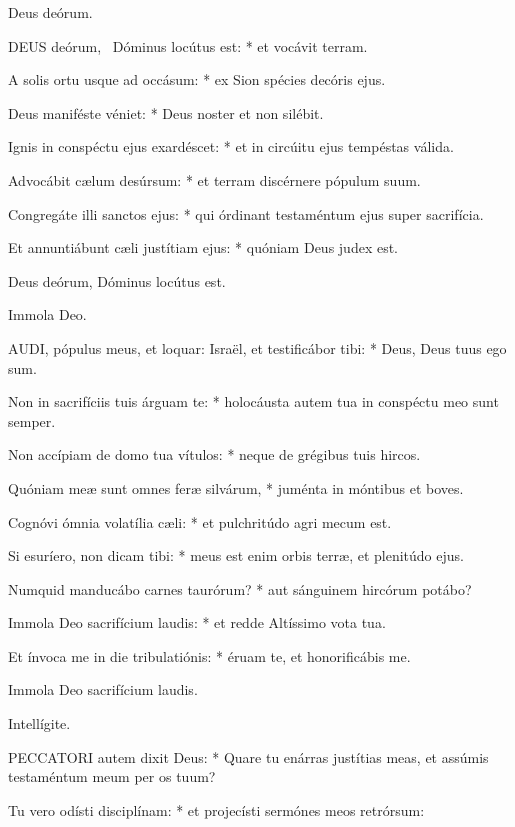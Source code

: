  Deus deórum. \textdagger


\lettrine[lines=2]{D}{EUS} deórum, \textdagger\ Dóminus locútus est: * et vocávit terram.

A solis ortu usque ad occásum: * ex Sion spécies decóris ejus.

Deus maniféste véniet: * Deus noster et non silébit.

Ignis in conspéctu ejus exardéscet: * et in circúitu ejus tempéstas válida.

Advocábit cælum desúrsum: * et terram discérnere pópulum suum.

Congregáte illi sanctos ejus: * qui órdinant testaméntum ejus super sacrifícia.

Et annuntiábunt cæli justítiam ejus: * quóniam Deus judex est.

 Deus deórum, Dóminus locútus est.

 Immola Deo.


\lettrine[lines=2]{A}{UDI}, pópulus meus, et loquar: Israël, et testificábor tibi: * Deus, Deus tuus ego sum.

Non in sacrifíciis tuis árguam te: * holocáusta autem tua in conspéctu meo sunt semper.

Non accípiam de domo tua vítulos: * neque de grégibus tuis hircos.

Quóniam meæ sunt omnes feræ silvárum, * juménta in móntibus et boves.

Cognóvi ómnia volatília cæli: * et pulchritúdo agri mecum est.

Si esuríero, non dicam tibi: * meus est enim orbis terræ, et plenitúdo ejus.

Numquid manducábo carnes taurórum? * aut sánguinem hircórum potábo?

Immola Deo sacrifícium laudis: * et redde Altíssimo vota tua.

Et ínvoca me in die tribulatiónis: * éruam te, et honorificábis me.

 Immola Deo sacrifícium laudis.

 Intellígite.


\lettrine[lines=2]{P}{ECCATORI} autem dixit Deus: * Quare tu enárras justítias meas, et assúmis testaméntum meum per os tuum?

Tu vero odísti disciplínam: * et projecísti sermónes meos retrórsum:


